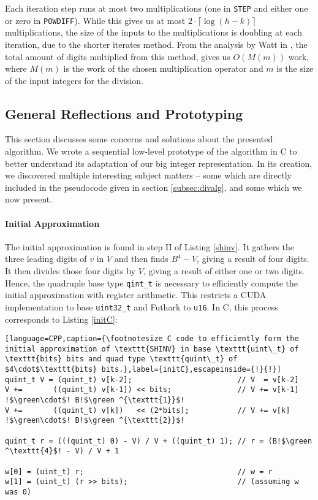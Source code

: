 Each iteration step runs at most two multiplications (one in \texttt{STEP} and
either one or zero in \texttt{POWDIFF}). While this gives us at most
$2 \cdot \lceil \log (h-k) \rceil$ multiplications, the size of the inputs to the
multiplications is doubling at each iteration, due to the shorter iterates
method. From the analysis by Watt in \cite{watt2023efficient}, the total amount
of digits multiplied from this method, gives us $O(M(m))$ work, where $M(m)$ is
the work of the chosen multiplication operator and $m$ is the size of the input
integers for the division.

\subsection{General Reflections and Prototyping}
\label{subsec:divproto}

This section discusses some concerns and solutions about the presented
algorithm. We wrote a sequential low-level prototype of the algorithm in C to
better understand its adaptation of our big integer representation. In its
creation, we discovered multiple interesting subject matters -- some which are
directly included in the pseudocode given in section \ref{subsec:divalg}, and
some which we now present.

\paragraph{Initial Approximation}
The initial approximation is found in step II of Listing \ref{shinv}. It gathers
the three leading digits of $v$ in $V$ and then finds $B^4-V$, giving a result
of four digits. It then divides those four digits by $V$, giving a result of
either one or two digits. Hence, the quadruple base type \texttt{qint\_t} is
necessary to efficiently compute the initial approximation with register
arithmetic. This restricts a CUDA implementation to base \texttt{uint32\_t} and
Futhark to \texttt{u16}. In C, this process corresponds to Listing \ref{initC}:
\begin{lstlisting}[language=CPP,caption={\footnotesize C code to efficiently form the initial approximation of \texttt{SHINV} in base \texttt{uint\_t} of \texttt{bits} bits and quad type \texttt{quint\_t} of $4\cdot$\texttt{bits} bits.},label={initC},escapeinside={!}{!}]
quint_t V = (quint_t) v[k-2];                        // V  = v[k-2]
V +=       ((quint_t) v[k-1]) << bits;               // V += v[k-1] !$\green\cdot$! B!$\green ^{\texttt{1}}$!
V +=       ((quint_t) v[k])   << (2*bits);           // V += v[k]   !$\green\cdot$! B!$\green ^{\texttt{2}}$!

quint_t r = (((quint_t) 0) - V) / V + ((quint_t) 1); // r = (B!$\green ^\texttt{4}$! - V) / V + 1

w[0] = (uint_t) r;                                   // w = r 
w[1] = (uint_t) (r >> bits);                         // (assuming w was 0)
\end{lstlisting}


